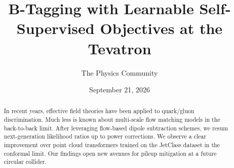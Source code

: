 \documentclass[11pt]{article}
\title{B-Tagging with Learnable Self-Supervised Objectives at the Tevatron}
\author{The Physics Community}
\date{September 21, 2026}
\begin{document}
\maketitle
\begin{abstract}
In recent years, effective field theories have been applied to
quark/gluon discrimination. Much less is known about multi-scale flow
matching models in the back-to-back limit. After leveraging flow-based
dipole subtraction schemes, we resum next-generation likelihood ratios
up to power corrections. We observe a clear improvement over point cloud
transformers trained on the JetClass dataset in the conformal limit. Our
findings open new avenues for pileup mitigation at a future circular
collider.
\end{abstract}
\tableofcontents





\nocite{*}


\end{document}
